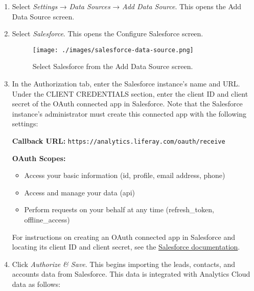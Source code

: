\begin{enumerate}
\def\labelenumi{\arabic{enumi}.}
\item
  Select \emph{Settings} → \emph{Data Sources} → \emph{Add Data Source}.
  This opens the Add Data Source screen.
\item
  Select \emph{Salesforce}. This opens the Configure Salesforce screen.

  \begin{figure}
  \centering
  \texttt{[image: ./images/salesforce-data-source.png]}
  \caption{Select Salesforce from the Add Data Source screen.}
  \end{figure}
\item
  In the Authorization tab, enter the Salesforce instance's name and
  URL. Under the CLIENT CREDENTIALS section, enter the client ID and
  client secret of the OAuth connected app in Salesforce. Note that the
  Salesforce instance's administrator must create this connected app
  with the following settings:

  \textbf{Callback URL:}
  \texttt{https://analytics.liferay.com/oauth/receive}

  \textbf{OAuth Scopes:}

  \begin{itemize}
  \tightlist
  \item
    Access your basic information (id, profile, email address, phone)
  \item
    Access and manage your data (api)
  \item
    Perform requests on your behalf at any time (refresh\_token,
    offline\_access)
  \end{itemize}

  For instructions on creating an OAuth connected app in Salesforce and
  locating its client ID and client secret, see the
  \href{https://help.salesforce.com/articleView?id=connected_app_overview.htm&type=5}{Salesforce
  documentation}.
\item
  Click \emph{Authorize \& Save}. This begins importing the leads,
  contacts, and accounts data from Salesforce. This data is integrated
  with Analytics Cloud data as follows:


\end{enumerate}
